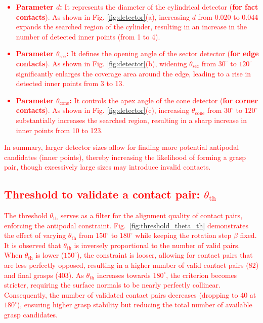 \documentclass[onecolumn]{IEEEtran}
\newcommand{\rev}[1]{\textcolor{red}{#1}}
\begin{document}
\rev{\begin{itemize}
    \item \textbf{Parameter $d$:} It represents the diameter of the cylindrical detector (\textbf{for fact contacts}). As shown in Fig. \ref{fig:detector}(a), increasing $d$ from 0.020 to 0.044 expands the searched region of the cylinder, resulting in an increase in the number of detected inner points (from 1 to 4).
    \item \textbf{Parameter $\theta_\text{sec}$:} It defines the opening angle of the sector detector (\textbf{for edge contacts}). As shown in Fig. \ref{fig:detector}(b), widening $\theta_\text{sec}$ from $30^\circ$ to $120^\circ$ significantly enlarges the coverage area around the edge, leading to a rise in detected inner points from 3 to 13.
    \item \textbf{Parameter $\theta_\text{cone}$:} It controls the apex angle of the cone detector (\textbf{for corner contacts}). As shown in Fig. \ref{fig:detector}(c), increasing $\theta_\text{cone}$ from $30^\circ$ to $120^\circ$ substantially increases the searched region, resulting in a sharp increase in inner points from 10 to 123.
\end{itemize}}

\rev{In summary, larger detector sizes allow for finding more potential antipodal candidates (inner points), thereby increasing the likelihood of forming a grasp pair, though excessively large sizes may introduce invalid contacts.}

\subsection{\rev{Threshold to validate a contact pair: $\theta_\text{th}$}}

\rev{The threshold $\theta_\text{th}$ serves as a filter for the alignment quality of contact pairs, enforcing the antipodal constraint. Fig.~\ref{fig:threshold_theta_th} demonstrates the effect of varying $\theta_\text{th}$ from $150^\circ$ to $180^\circ$ while keeping the rotation step $\beta$ fixed.
It is observed that $\theta_\text{th}$ is inversely proportional to the number of valid pairs. When $\theta_\text{th}$ is lower ($150^\circ$), the constraint is looser, allowing for contact pairs that are less perfectly opposed, resulting in a higher number of valid contact pairs (82) and final grasps (403).
As $\theta_\text{th}$ increases towards $180^\circ$, the criterion becomes stricter, requiring the surface normals to be nearly perfectly collinear. Consequently, the number of validated contact pairs decreases (dropping to 40 at $180^\circ$), ensuring higher grasp stability but reducing the total number of available grasp candidates.}
\end{document}
